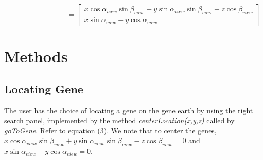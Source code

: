 \documentclass[]{article}
\begin{document}
\begin{equation}
\hspace{100pt}=\left[ 
\begin{array}{c}
x\cos \alpha_{view} \sin \beta_{view} + y\sin \alpha_{view} \sin \beta_{view} -z\cos \beta_{view}  \\ 
x\sin \alpha_{view} -y\cos \alpha_{view} 
\end{array}%
\right]
\end{equation} \label{eq3}



\pagebreak
\section{Methods}


\subsection{Locating Gene}

The user has the choice of locating a gene on the gene earth by using the right search panel, implemented by the method \textit{centerLocation(x,y,z)} called by \textit{goToGene}. Refer to equation (3). We note that to center the genes, $x\cos \alpha_{view} \sin \beta_{view} + y\sin \alpha_{view} \sin \beta_{view} -z\cos \beta_{view}=0$ and $x \sin \alpha_{view} -y\cos \alpha_{view} = 0$. 
\end{document}
